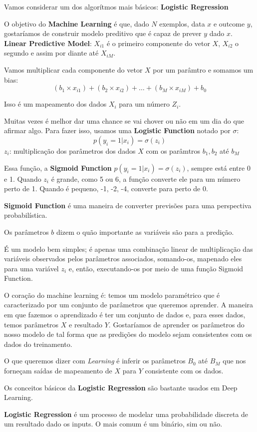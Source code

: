 \documentclass[11pt, a4paper]{article}
\begin{document}
Vamos considerar um dos algorítmos mais básicos: \textbf{Logistic Regression}

O objetivo do \textbf{Machine Learning} é que, dado $N$ exemplos, data $x$ e outcome $y$, gostaríamos de construir modelo preditivo que é capaz de prever $y$ dado $x$.\\

\textbf{Linear Predictive Model}: $X_{i1}$ é o primeiro componente do vetor $X$, $X_{i2}$ o segundo e assim por diante até $X_{iM}$.

Vamos multiplicar cada componente do vetor $X$ por um parâmtro e somamos um bias:
$$(b_1 \times x_{i1}) + (b_2 \times x_{i2}) + \dots + (b_M \times x_{iM}) + b_0 $$

Isso é um mapeamento dos dados $X_i$ para um número $Z_i$.

Muitas vezes é melhor dar uma chance se vai chover ou não em um dia do que afirmar algo. Para fazer isso, usamos uma \textbf{Logistic Function} notado por $\sigma$:
$$ p(y_i = 1 | x_i) = \sigma (z_i) $$
$z_i$: multiplicação dos parâmetros dos dados $X$ com os parâmtros $b_1, b_2$ até $b_M$

Essa função, a \textbf{Sigmoid Function} $p(y_i = 1 | x_i) = \sigma(z_i)$, sempre está entre 0 e 1. Quando $z_i$ é grande, como 5 ou 6, a função converte ele para um número perto de 1. Quando é pequeno, -1, -2, -4, converte para perto de 0.


\textbf{Sigmoid Function} é uma maneira de converter previsões para uma perspectiva probabilística.


Os parâmetros $b$ dizem o quão importante as variáveis são para a predição.


É um modelo bem simples; é apenas uma combinação linear de multiplicação das variáveis observados pelos parâmetros associados, somando-os, mapenado eles para uma variável $z_i$ e, então, executando-os por meio de uma função Sigmoid Function.


O coração do machine learning é: temos um modelo paramétrico que é caracterizado por um conjunto de parâmetros que queremos aprender. A maneira em que fazemos o aprendizado é ter um conjunto de dados e, para esses dados, temos parâmetros $X$ e resultado $Y$. Gostaríamos de aprender os parâmetros do nosso modelo de tal forma que as predições do modelo sejam consistentes com os dados do treinamento.

O que queremos dizer com \textit{Learning} é inferir os parâmetros $B_0$ até $B_M$ que nos forneçam saídas de mapeamento de $X$ para $Y$ consistente com os dados.

Os conceitos básicos da \textbf{Logistic Regression} são bastante usados em Deep Learning.

\textbf{Logistic Regression} é um processo de modelar uma probabilidade discreta de um resultado dado os inputs. O mais comum é um binário, sim ou não.
\end{document}
